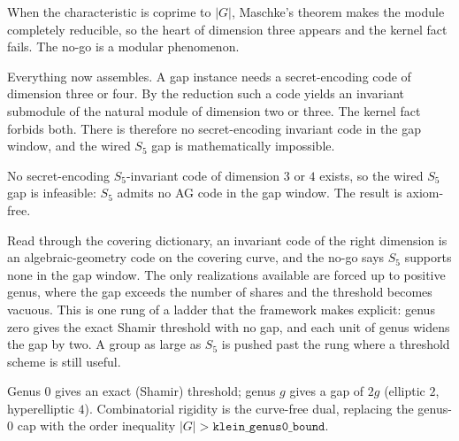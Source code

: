 \begin{theorem}
  \label{thm:maschke_contrast}
  \rocqok
  When the characteristic is coprime to $|G|$, Maschke's theorem makes the module
  completely reducible, so the heart of dimension three appears and the kernel
  fact fails. The no-go is a modular phenomenon.
\end{theorem}

Everything now assembles. A gap instance needs a secret-encoding code of
dimension three or four. By the reduction such a code yields an invariant
submodule of the natural module of dimension two or three. The kernel fact
forbids both. There is therefore no secret-encoding invariant code in the gap
window, and the wired $S_5$ gap is mathematically impossible.

\begin{theorem}[The $S_5$ no-go]
  \label{thm:s5_nogo}
  \rocqok
  No secret-encoding $S_5$-invariant code of dimension $3$ or $4$ exists, so the
  wired $S_5$ gap is infeasible: $S_5$ admits no AG code in the gap window. The
  result is axiom-free.
\end{theorem}

Read through the covering dictionary, an invariant code of the right dimension is
an algebraic-geometry code on the covering curve, and the no-go says $S_5$
supports none in the gap window. The only realizations available are forced up to
positive genus, where the gap exceeds the number of shares and the threshold
becomes vacuous. This is one rung of a ladder that the framework makes explicit:
genus zero gives the exact Shamir threshold with no gap, and each unit of genus
widens the gap by two. A group as large as $S_5$ is pushed past the rung where a
threshold scheme is still useful.

\begin{definition}
  \label{def:genus_ladder}
  \rocqok
  Genus $0$ gives an exact (Shamir) threshold; genus $g$ gives a gap of $2g$
  (elliptic $2$, hyperelliptic $4$). Combinatorial rigidity is the curve-free
  dual, replacing the genus-0 cap with the order inequality $|G| >
  \mathtt{klein\_genus0\_bound}$.
\end{definition}

